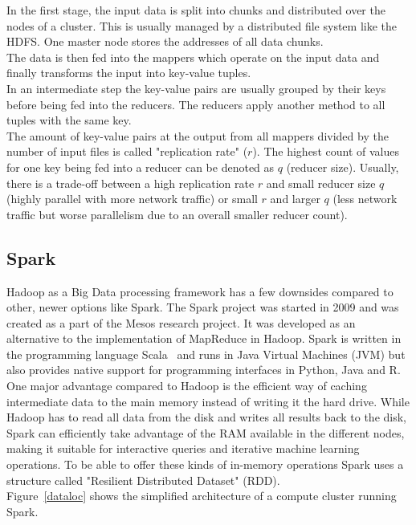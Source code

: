 \noindent In the first stage, the input data is split into chunks and distributed over the nodes of a cluster. This is usually managed by a distributed file system like the HDFS. One master node stores the addresses of all data chunks.\\
The data is then fed into the mappers which operate on the input data and finally transforms the input into key-value tuples.\\
In an intermediate step the key-value pairs are usually grouped by their keys before being fed into the reducers. The reducers apply another method to all tuples with the same key.\\
The amount of key-value pairs at the output from all mappers divided by the number of input files is called "replication rate" ($r$). The highest count of values for one key being fed into a reducer can be denoted as $q$ (reducer size). Usually, there is a trade-off between a high replication rate $r$ and small reducer size $q$ (highly parallel with more network traffic) or small $r$ and larger $q$ (less network traffic but worse parallelism due to an overall smaller reducer count).

\subsection{Spark}\label{sparksec}

Hadoop as a Big Data processing framework has a few downsides compared to other, newer options like Spark. The Spark project was started in 2009 and was created as a part of the Mesos research project. It was developed as an alternative to the implementation of MapReduce in Hadoop. Spark is written in the programming language Scala~\cite{scalalang} and runs in Java Virtual Machines (JVM) but also provides native support for programming interfaces in Python, Java and R. One major advantage compared to Hadoop is the efficient way of caching intermediate data to the main memory instead of writing it the hard drive. While Hadoop has to read all data from the disk and writes all results back to the disk, Spark can efficiently take advantage of the RAM available in the different nodes, making it suitable for interactive queries and iterative machine learning operations. To be able to offer these kinds of in-memory operations Spark uses a structure called "Resilient Distributed Dataset" (RDD).~\cite[p. 13]{sparkbook1}\\ 
Figure~\ref{dataloc} shows the simplified architecture of a compute cluster running Spark. 

